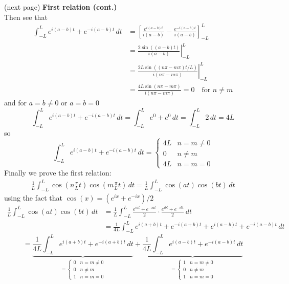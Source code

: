 \documentclass{report}
\begin{document}
(next page)
\newpage
\noindent\textbf{First relation (cont.)}\\
Then see that 
\begin{align*}
\int^L_{-L}e^{i(a-b)t}+e^{-i(a-b)t}\,dt&=\left[\frac{e^{i(a-b)t}}{i(a-b)}-\frac{e^{-i(a-b)t}}{i(a-b)}\right]^L_{-L}\\
&=\left.\frac{2\sin((a-b)t)}{i(a-b)}\right|^L_{-L}\\
&=\left.\frac{2L\sin((n\pi-m\pi)t/L)}{i(n\pi-m\pi)}\right|^L_{-L}\\
&=\frac{4L\sin(n\pi-m\pi)}{i(n\pi-m\pi)}=0\quad\text{for $n\neq m$}
\end{align*}
and for $a=b\neq0$ or $a=b=0$
\begin{equation*}
\int^L_{-L}e^{i(a-b)t}+e^{-i(a-b)t}\,dt=\int^L_{-L}e^{0}+e^{0}\,dt=\int^L_{-L}2\,dt=4L
\end{equation*}
so
\begin{equation*}
\int^L_{-L}e^{i(a-b)t}+e^{-i(a-b)t}\,dt=\begin{cases}
4L&n=m\neq0\\
0&n\neq m\\
4L&n=m=0
\end{cases}
\end{equation*}
Finally we prove the first relation:
\begin{align*}
\frac{1}{L}\int^L_{-L}\cos\left(n\frac{\pi}{L}t\right)\cos\left(m\frac{\pi}{L}t\right)\,dt=
\frac{1}{L}\int^L_{-L}\cos(at)\cos(bt)\,dt
\end{align*}
using the fact that $\cos(x)=(e^{ix}+e^{-ix})/2$
\begin{align*}
\frac{1}{L}\int^L_{-L}\cos(at)\cos(bt)\,dt&=
\frac{1}{L}\int^L_{-L}\frac{e^{iat}+e^{-iat}}{2}\cdot
\frac{e^{ibt}+e^{-ibt}}{2}\,dt\\
&=\frac{1}{4L}\int^L_{-L}e^{i(a+b)t}+e^{-i(a+b)t}
+e^{i(a-b)t}+e^{-i(a-b)t}\,dt
\end{align*}
\begin{equation*}
=\underbrace{\frac{1}{4L}\int^L_{-L}e^{i(a+b)t}+e^{-i(a+b)t}\,dt}_{=\begin{cases}0&n=m\neq0\\
0&n\neq m\\
1&n=m=0
\end{cases}}
+\underbrace{\frac{1}{4L}\int^L_{-L}e^{i(a-b)t}+e^{-i(a-b)t}\,dt}_{=\begin{cases}
1&n=m\neq0\\
0&n\neq m\\
1&n=m=0
\end{cases}}
\end{equation*}
\end{document}
